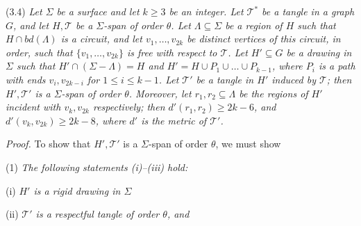 \stmt
(3.4) \textit{Let $\Sigma$ be a surface and let $k \ge 3$ be an integer. Let $\mathscr{T}^*$ be a tangle in a graph $G$, and let $H, \mathscr{T}$ be a $\Sigma$-span of order $\theta$. Let $\Lambda \subseteq \Sigma$ be a region of $H$ such that $H \cap bd(\Lambda)$ is a circuit, and let $v_1, \dots, v_{2k}$ be distinct vertices of this circuit, in order, such that $\{v_1, \dots, v_{2k}\}$ is free with respect to $\mathscr{T}$. Let $H' \subseteq G$ be a drawing in $\Sigma$ such that $H' \cap (\Sigma - \Lambda) = H$ and $H' = H \cup P_1 \cup \dots \cup P_{k-1}$, where $P_i$ is a path with ends $v_i, v_{2k-i}$ for $1 \le i \le k - 1$. Let $\mathscr{T}'$ be a tangle in $H'$ induced by $\mathscr{T}$; then $H', \mathscr{T}'$ is a $\Sigma$-span of order $\theta$. Moreover, let $r_1, r_2 \subseteq \Lambda$ be the regions of $H'$ incident with $v_k, v_{2k}$ respectively; then $d'(r_1, r_2) \ge 2k - 6$, and $d'(v_k, v_{2k}) \ge 2k - 8$, where $d'$ is the metric of $\mathscr{T}'$.}

\textit{Proof.} To show that $H', \mathscr{T}'$ is a $\Sigma$-span of order $\theta$, we must show

\hspace*{12pt}(1) \textit{The following statements (i)--(iii) hold:}

\hspace*{12pt}(i) \textit{$H'$ is a rigid drawing in $\Sigma$}

\hspace*{12pt}(ii) \textit{$\mathscr{T}'$ is a respectful tangle of order $\theta$, and}
